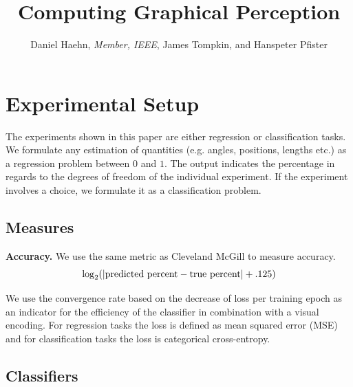 \documentclass[journal]{vgtc}                %
\title{Computing Graphical Perception}
\author{Daniel Haehn, \textit{Member, IEEE}, James Tompkin, and Hanspeter Pfister}
\begin{document}






\section{Experimental Setup}

The experiments shown in this paper are either regression or classification tasks. We formulate any estimation of quantities (e.g. angles, positions, lengths etc.) as a regression problem between $0$ and $1$. The output indicates the percentage in regards to the degrees of freedom of the individual experiment. If the experiment involves a choice, we formulate it as a classification problem.

\subsection{Measures}

\textbf{Accuracy.} We use the same metric as Cleveland McGill to measure accuracy.
\begin{equation}
	\log_2( | \textnormal{predicted percent} - \textnormal{true percent} | + .125)
\end{equation}

 We use the convergence rate based on the decrease of loss per training epoch as an indicator for the efficiency of the classifier in combination with a visual encoding. For regression tasks the loss is defined as mean squared error (MSE) and for classification tasks the loss is categorical cross-entropy.

\subsection{Classifiers}
\end{document}
